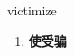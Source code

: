 
\begin{frame}
{\huge victimize}
\begin{center}
\begin{enumerate}\Large
  \item \textbf{使受骗}
\end{enumerate}
\end{center}
\end{frame}

